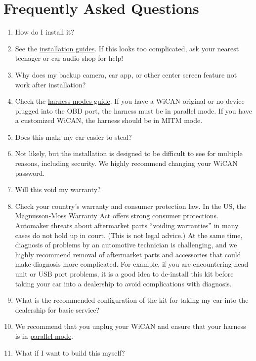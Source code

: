 \documentclass[superscriptaddress,onecolumn,floatfix]{revtex4-2}
\begin{document}
\section{Frequently Asked Questions}
\begin{enumerate}
  \item[Q:] How do I install it?
  \item[A:] See the \href{https://github.com/tylerharvey/Ioniq5_CAN/tree/main/guides/}{installation guides}. If this looks too complicated, ask your nearest teenager or car audio shop for help!
  \item[Q:] Why does my backup camera, car app, or other center screen feature not work after installation?
  \item[A:] Check the \href{https://github.com/tylerharvey/Ioniq5_CAN/blob/main/guides/harnesses/head_unit_MITM/MITM_harness_modes.pdf}{harness modes guide}. If you have a WiCAN original or no device plugged into the OBD port, the harness must be in parallel mode. If you have a customized WiCAN, the harness should be in MITM mode.
  \item[Q:] Does this make my car easier to steal?
  \item[A:] Not likely, but the installation is designed to be difficult to see for multiple reasons, including security. We highly recommend changing your WiCAN password. 
  \item[Q:] Will this void my warranty?
  \item[A:] Check your country's warranty and consumer protection law. In the US, the Magnusson-Moss Warranty Act offers strong consumer protections. Automaker threats about aftermarket parts ``voiding warranties'' in many cases do not hold up in court. (This is not legal advice.) At the same time, diagnosis of problems by an automotive technician is challenging, and we highly recommend removal of aftermarket parts and accessories that could make diagnosis more complicated. For example, if you are encountering head unit or USB port problems, it is a good idea to de-install this kit before taking your car into a dealership to avoid complications with diagnosis. 
  \item[Q:] What is the recommended configuration of the kit for taking my car into the dealership for basic service?
  \item[A:] We recommend that you unplug your WiCAN and ensure that your harness is in \href{https://github.com/tylerharvey/Ioniq5_CAN/blob/main/guides/harnesses/head_unit_MITM/MITM_harness_modes.pdf}{parallel mode}.
  \item[Q:] What if I want to build this myself?

\end{enumerate}
\end{document}
